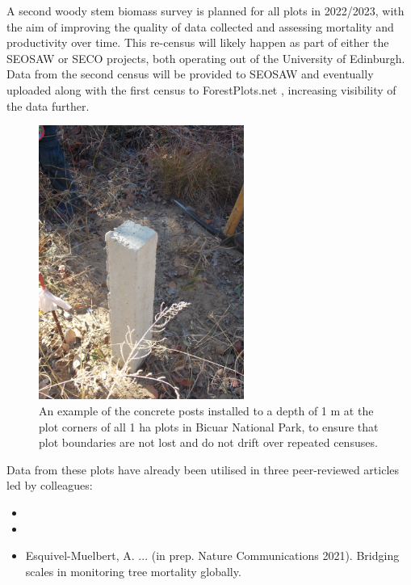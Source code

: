 \begin{refsection}
A second woody stem biomass survey is planned for all plots in 2022/2023, with the aim of improving the quality of data collected and assessing mortality and productivity over time. This re-census will likely happen as part of either the SEOSAW or SECO projects, both operating out of the University of Edinburgh. Data from the second census will be provided to SEOSAW and eventually uploaded along with the first census to ForestPlots.net \citep{LopezGonzalez2011}, increasing visibility of the data further.

\begin{figure}[H]
\centering
	\includegraphics[width=0.6\textwidth]{img/concrete}
	\caption{An example of the concrete posts installed to a depth of 1 m at the plot corners of all 1 ha plots in
	Bicuar National Park, to ensure that plot boundaries are not lost and do not drift over
repeated censuses.}
	\label{concrete}
\end{figure}

Data from these plots have already been utilised in three peer-reviewed articles led by colleagues:

\begin{itemize}
	\item{}
	\item{}
	\item{Esquivel-Muelbert, A. ... (in prep. Nature Communications 2021). Bridging scales in monitoring tree mortality globally.}
\end{itemize}


\end{refsection}
